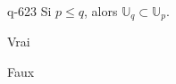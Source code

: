 \begin{truefalse}{q-623}
Si $p\leq q$, alors $\mathbb U_q \subset  \mathbb U_p$.
\item Vrai
\item* Faux
\end{truefalse}


